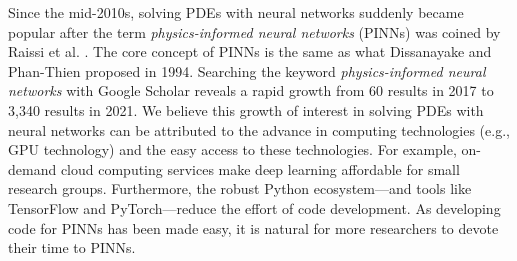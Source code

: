 Since the mid-2010s, solving PDEs with neural networks suddenly became popular after the term {\it physics-informed neural networks} (PINNs) was coined by Raissi et al. \cite{raissi_physics-informed_2017}.
The core concept of PINNs is the same as what Dissanayake and Phan-Thien proposed in 1994.
Searching the keyword {\it physics-informed neural networks} with Google Scholar reveals a rapid growth from 60 results in 2017 to 3,340 results in 2021.
We believe this growth of interest in solving PDEs with neural networks can be attributed to the advance in computing technologies (e.g., GPU technology) and the easy access to these technologies.
For example, on-demand cloud computing services make deep learning affordable for small research groups.
Furthermore, the robust Python ecosystem---and tools like TensorFlow and PyTorch---reduce the effort of code development. 
As developing code for PINNs has been made easy, it is natural for more researchers to devote their time to PINNs.

